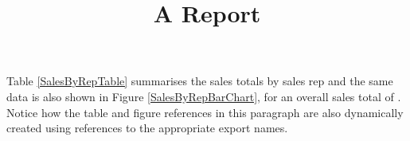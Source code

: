 \documentclass[10pt]{article}
\title{A Report}
\date{}
\begin{document}
\maketitle 



Table \ref{SalesByRepTable} summarises the sales totals by sales rep and the same data is also shown in Figure \ref{SalesByRepBarChart}, for an overall sales total of \TotalSales. Notice how the table and figure references in this paragraph are also dynamically created using references to the appropriate export names.

\SalesByRepTable

\SalesByRepBarChart
\end{document}
